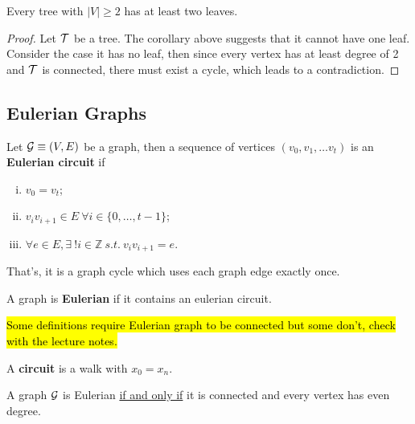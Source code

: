 \documentclass{article}
\def\Z{{\mathbb Z}}
\begin{document}
		\begin{proposition}
			Every tree with $|V| \geq 2$ has at least two leaves.
			\begin{proof}
				Let $\mathcal{{T}}$ be a tree. The corollary above suggests that it cannot have one leaf. Consider the case it has no leaf, then since every vertex has at least degree of 2 and $\mathcal{{T}}$ is connected, there must exist a cycle, which leads to a contradiction.
			\end{proof}
		\end{proposition}
		
		\subsection{Eulerian Graphs}
			\begin{definition}
				Let $\mathcal{{G}} \equiv (V, E)$ be a graph, then a sequence of vertices $(v_0,v_1,\dots v_t)$ is an \textbf{Eulerian circuit} if 
				\begin{enumerate}[(i)]
					\item $v_0 = v_t$;
					\item $v_i v_{i+1} \in E\ \forall i \in \{0, \dots, t-1\}$;
					\item $\forall e \in E, \exists\ ! i \in \Z\ s.t.\ v_i v_{i+1} = e$.
				\end{enumerate}
				That's, it is a graph cycle which uses each graph edge exactly once.
			\end{definition}
			
			\begin{definition}
				A graph is \textbf{Eulerian} if it contains an eulerian circuit.
			\end{definition}
			
			\begin{remark}
				\hl{Some definitions require Eulerian graph to be connected but some don't, check with the lecture notes.}
			\end{remark}
			
			\begin{definition}
				A \textbf{circuit} is a walk with $x_0 = x_n$.
			\end{definition}
			
			\begin{theorem}
				A graph $\mathcal{{G}}$ is Eulerian \ul{if and only if} it is connected and every vertex has even degree.
			\end{theorem}
		
\end{document}
